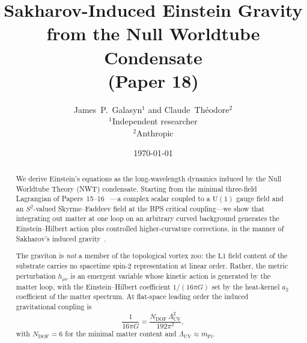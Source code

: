 \documentclass[11pt]{article}
\newcommand{\mPl}{m_{\mathrm{Pl}}}
\newcommand{\U}{\mathrm{U}}
\begin{document}
\title{Sakharov-Induced Einstein Gravity\\[2pt]
from the Null Worldtube Condensate\\[4pt]
\normalsize (Paper 18)}

\author{
  James~P.~Galasyn$^{1}$ \quad and \quad Claude~Th\'eodore$^{2}$\\[2pt]
  \small $^1$Independent researcher \\
  \small $^2$Anthropic
}

\date{\today}

\maketitle

\begin{abstract}
We derive Einstein's equations as the long-wavelength dynamics
induced by the Null Worldtube Theory (NWT) condensate.  Starting
from the minimal three-field Lagrangian of Papers~15--16%
~\cite{paper15, paper16}---a complex scalar coupled to a $\U(1)$
gauge field and an $S^2$-valued Skyrme--Faddeev field at the BPS
critical coupling---we show that integrating out matter at one
loop on an arbitrary curved background generates the
Einstein--Hilbert action plus controlled higher-curvature
corrections, in the manner of Sakharov's induced
gravity~\cite{sakharov1968, visser2002}.

The graviton is \emph{not} a member of the topological vortex zoo:
the $\mathrm{L}1$ field content of the substrate carries no
spacetime spin-$2$ representation at linear order.  Rather, the
metric perturbation $h_{\mu\nu}$ is an emergent variable whose
kinetic action is generated by the matter loop, with the
Einstein--Hilbert coefficient $1/(16\pi G)$ set by the heat-kernel
$a_2$ coefficient of the matter spectrum.  At flat-space leading
order the induced gravitational coupling is
\begin{equation*}
  \frac{1}{16\pi G}
  = \frac{N_{\mathrm{DOF}}\,\Lambda_{\mathrm{UV}}^2}{192\pi^2},
\end{equation*}
with $N_{\mathrm{DOF}} = 6$ for the minimal matter content and
$\Lambda_{\mathrm{UV}} \approx \mPl$.


\end{abstract}
\end{document}

